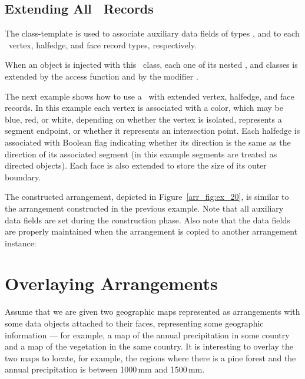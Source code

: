 
\subsection{Extending All \dcel\ Records}
\label{arr_ssec:ex_dcel_all}
%
The 
class-template is used to associate auxiliary data fields of
types  , and  to
each \dcel\ vertex, halfedge, and face record types, respectively.

When an  object is injected with this
\dcel\ class, each one of its nested ,  and
 classes is extended by the access function 
and by the modifier .

The next example shows how to use a \dcel\ with extended vertex,
halfedge, and face records. In this example each vertex is associated 
with a color, which may be blue, red, or white, depending on whether the
vertex is isolated, represents a segment endpoint, or whether it
represents an intersection point. Each halfedge is associated with
Boolean flag indicating whether its direction is the same as the
direction of its associated segment (in this example segments are
treated as directed objects). Each face is also extended to store the
size of its outer boundary.

The constructed arrangement, depicted in Figure~\ref{arr_fig:ex_20}, is 
similar to the arrangement constructed in the previous example. 
Note that all auxiliary data fields are set during the construction phase.
Also note that the data fields are properly maintained when the arrangement
is copied to another arrangement instance:
 

\section{Overlaying Arrangements}
\label{arr_sec:overlay}
%
Assume that we are given two geographic maps represented as
arrangements with some data objects attached to their faces,
representing some geographic information --- for example, a map of
the annual precipitation in some country and a map of the vegetation
in the same country. It is interesting to overlay the two maps to
locate, for example, the regions where there is a pine forest and
the annual precipitation is between 1000\,mm and 1500\,mm. 

